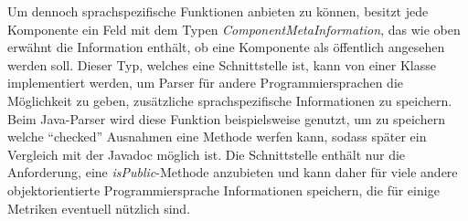 Um dennoch sprachspezifische Funktionen anbieten zu können, besitzt jede Komponente ein Feld mit dem Typen \textit{ComponentMetaInformation}, das wie oben erwähnt die Information enthält, ob eine Komponente als öffentlich angesehen werden soll. Dieser Typ, welches eine Schnittstelle ist, kann von einer Klasse implementiert werden, um Parser für andere Programmiersprachen die Möglichkeit zu geben, zusätzliche sprachspezifische Informationen zu speichern. Beim Java-Parser wird diese Funktion beispielsweise genutzt, um zu speichern welche \enquote{checked} Ausnahmen eine Methode werfen kann, sodass später ein Vergleich mit der Javadoc möglich ist. Die Schnittstelle enthält nur die Anforderung, eine \textit{isPublic}-Methode anzubieten und kann daher für viele andere objektorientierte Programmiersprache Informationen speichern, die für einige Metriken eventuell nützlich sind. 
 \clearpage
